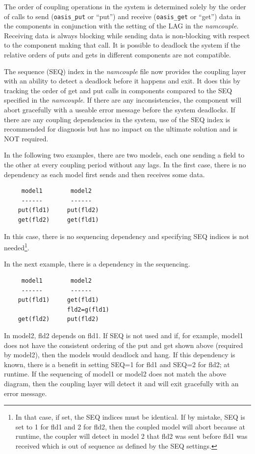 The order of coupling operations in the system is determined solely by
the order of calls to send ({\tt oasis\_put} or ``put'') and receive ({\tt oasis\_get} or ``get'') data in the components
in conjunction with the setting of the LAG in the {\it namcouple}.
Receiving data is always blocking while sending data is non-blocking with respect to the component making that call.  It
is possible to deadlock the system if the relative orders of puts and
gets in different components are not compatible.

The sequence (SEQ) index in the {\it namcouple} file
now provides the coupling layer with an ability to detect a deadlock
before it happens and exit.  It does this by tracking the order of get
and put calls in components compared to the SEQ specified in the {\it
  namcouple}.  If there are any inconsistencies, the component will abort
gracefully with a useable error message before the system deadlocks.
If there are any coupling dependencies in the system, use of the SEQ
index is recommended for diagnosis but has no impact on the ultimate
solution and is NOT required.

In the following two examples, there are two
models, each one sending a field to the other at every coupling period
without any lags.  In the first case, there is no dependency as each
model first sends and then receives some data.

\begin{verbatim}
     model1        model2
     ------        ------
    put(fld1)     put(fld2)
    get(fld2)     get(fld1)
\end{verbatim}

In this case, there is no sequencing dependency and specifying SEQ indices is not needed\footnote{In that case, if set, the SEQ indices
must be identical.  If by mistake, SEQ is set to 1 for fld1 and 2 for fld2,
then the coupled model will abort because at runtime, the coupler will
detect in model 2 that fld2 was sent before fld1 was received which is out of sequence as defined by the SEQ settings.}.

In the next example, there is a dependency in the sequencing.

\begin{verbatim}
     model1        model2
     ------        ------
    put(fld1)     get(fld1)
                  fld2=g(fld1)
    get(fld2)     put(fld2)
\end{verbatim}

In model2, fld2 depends on fld1. If SEQ is not used and if, for example, model1 does not have the
consistent ordering of the put and get shown above (required by model2), then the models would deadlock and hang. If this dependency is known, there is a benefit in setting SEQ=1 for fld1 and SEQ=2 for fld2; at
runtime. If the sequencing of model1 or model2 does not match the
above diagram, then the  coupling layer will detect it and will exit gracefully with an error message.

